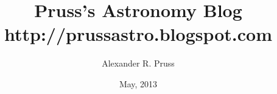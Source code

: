 \documentclass[titlepage,twocolumn,twoside,openright,final,11pt]{book}
\title{Pruss's Astronomy Blog\\
http://prussastro.blogspot.com}
\author{Alexander R. Pruss}
\date{May, 2013}
\begin{document}
\maketitle
\sloppy
\end{document}
